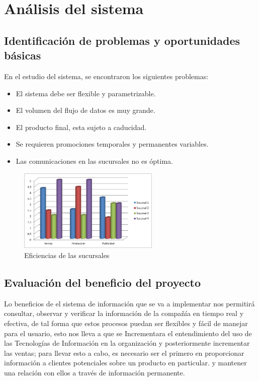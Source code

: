 \chapter{An\'alisis del sistema}
\section{Identificaci\'on de problemas y oportunidades b\'asicas}
En el estudio del sistema, se encontraron los siguientes problemas:%
\\%
\begin{itemize}
	\item El sistema debe ser flexible y parametrizable.%
	\item El volumen del flujo de datos es muy grande.%
	\item El producto final, esta sujeto a caducidad.%
	\item Se requieren promociones temporales y permanentes variables.%
	\item Las comunicaciones en las sucursales no es \'optima.%
\end{itemize}%
%
\begin{figure}[htbp]
	\centering
		\includegraphics[width=0.60\textwidth]{images/Eficienciadelasucursal.jpg}
	\caption{Eficiencias de las sucursales}
	\label{fig:eficienciasucursales}
\end{figure}%
%
\section{Evaluaci\'on del beneficio del proyecto}
Lo beneficios de el sistema de informaci\'on que se va a implementar nos permitir\'a consultar, observar y verificar la informaci\'on de la compa\~n\'ia en tiempo real y efectiva, de tal forma que estos procesos puedan ser flexibles y f\'acil de manejar para el usuario, esto nos lleva a que se Incrementara  el entendimiento del uso de las Tecnolog\'ias de Informaci\'on en la organizaci\'on y posteriormente  incrementar las ventas; para llevar esto a cabo, es necesario ser el primero en proporcionar informaci\'on a clientes potenciales sobre un producto en particular. y mantener una relaci\'on con ellos a trav\'es de informaci\'on permanente.%
%
